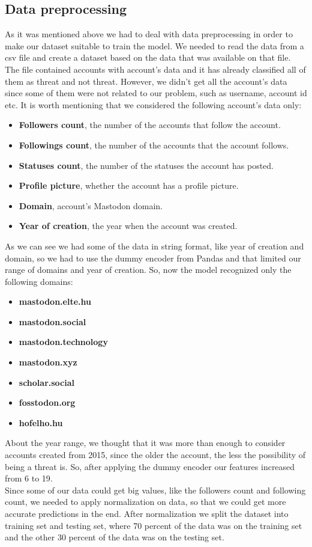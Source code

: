 \subsection{Data preprocessing}
As it was mentioned above we had to deal with data preprocessing in order to make our dataset suitable
to train the model. We needed to read the data from a csv file and create a dataset based on the data
that was available on that file. The file contained accounts with account's data and it has already classified all of them as threat
and not threat. However, we didn't get all the account's data since some of them were not related to our problem, such as username, account id etc.
It is worth mentioning that we considered the following account's data only:
\begin{itemize}
	\item \textbf{Followers count}, the number of the accounts that follow the account.
	\item \textbf{Followings count}, the number of the accounts that the account follows.
	\item \textbf{Statuses count}, the number of the statuses the account has posted.
	\item \textbf{Profile picture}, whether the account has a profile picture.
	\item \textbf{Domain}, account's Mastodon domain.
	\item \textbf{Year of creation}, the year when the account was created.
\end{itemize}
As we can see we had some of the data in string format, like year of creation and domain, so we
had to use the dummy encoder from Pandas and that limited our range of domains and year of creation.
So, now the model recognized only the following domains:
\begin{itemize}
	\item \textbf{mastodon.elte.hu}
	\item \textbf{mastodon.social}
	\item \textbf{mastodon.technology}
	\item \textbf{mastodon.xyz}
	\item \textbf{scholar.social}
	\item \textbf{fosstodon.org}
	\item \textbf{hofelho.hu}
\end{itemize}
About the year range, we thought that it was more than enough to consider accounts created from 2015, since
the older the account, the less the possibility of being a threat is.
So, after applying the dummy encoder our features increased from 6 to 19.
\\[5pt]
Since some of our data could get big values, like the followers count and following count, we needed
to apply normalization on data, so that we could get more accurate predictions in the end.
After normalization we split the dataset into training set and testing set, where 70 percent of the data was on the
training set and the other 30 percent of the data was on the testing set.
